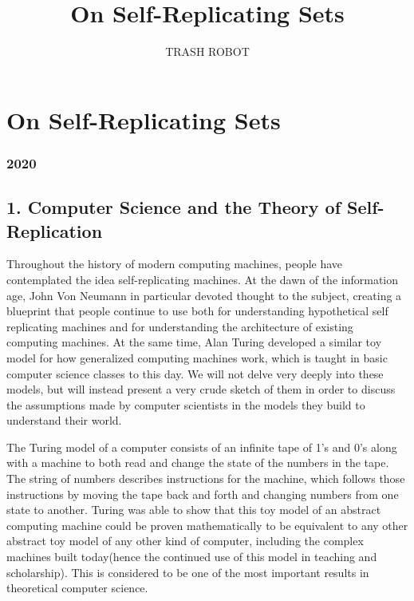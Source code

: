 \documentclass[12pt,a4paper]{amsart}
\numberwithin{equation}{section}
\begin{document}
\title{On Self-Replicating Sets}

\author{TRASH ROBOT}

\maketitle
\section{On Self-Replicating Sets}\label{on-self-replicating-sets}


\subsubsection{2020}\label{section}


\subsection{1. Computer Science and the Theory of
Self-Replication}\label{computer-science-and-the-theory-of-self-replication}

Throughout the history of modern computing machines, people have
contemplated the idea self-replicating machines. At the dawn of the
information age, John Von Neumann in particular devoted thought to the
subject, creating a blueprint that people continue to use both for
understanding hypothetical self replicating machines and for
understanding the architecture of existing computing machines. At the
same time, Alan Turing developed a similar toy model for how generalized
computing machines work, which is taught in basic computer science
classes to this day. We will not delve very deeply into these models,
but will instead present a very crude sketch of them in order to discuss
the assumptions made by computer scientists in the models they build to
understand their world.

The Turing model of a computer consists of an infinite tape of 1's and
0's along with a machine to both read and change the state of the
numbers in the tape. The string of numbers describes instructions for
the machine, which follows those instructions by moving the tape back
and forth and changing numbers from one state to another. Turing was
able to show that this toy model of an abstract computing machine could
be proven mathematically to be equivalent to any other abstract toy
model of any other kind of computer, including the complex machines
built today(hence the continued use of this model in teaching and
scholarship). This is considered to be one of the most important results
in theoretical computer science.
\end{document}

